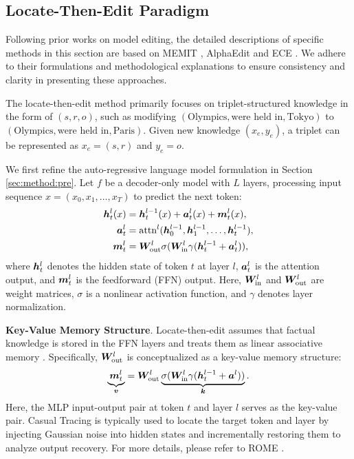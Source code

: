 \subsection{Locate-Then-Edit Paradigm}\label{app:model_edit}
Following prior works on model editing, the detailed descriptions of specific methods in this section are based on MEMIT \cite{MEMIT}, AlphaEdit \cite{AlphaEdit} and ECE \cite{ECE}. We adhere to their formulations and methodological explanations to ensure consistency and clarity in presenting these approaches.

The locate-then-edit method primarily focuses on triplet-structured knowledge in the form of $(s, r, o)$, such as modifying $(\text{Olympics}, \text{were held in}, \text{Tokyo})$ to $(\text{Olympics}, \text{were held in}, \text{Paris})$. Given new knowledge $(x_e, y_e)$, a triplet can be represented as $x_e = (s, r)$ and $y_e = o$.

We first refine the auto-regressive language model formulation in Section \ref{sec:method:pre}. Let $f$ be a decoder-only model with $L$ layers, processing input sequence $x = (x_0, x_1, \dots, x_T)$ to predict the next token:
\begin{equation}
    \begin{aligned}
        {\bm{h}}_t^l(x) &= {\bm{h}}_t^{l - 1}(x) + {\bm{a}}_t^l(x) + {\bm{m}}_t^l(x), \\
        {\bm{a}}_t^l &= \text{attn}^l({\bm{h}}_0^{l - 1}, {\bm{h}}_1^{l - 1}, \dots, {\bm{h}}_t^{l - 1}), \\
        {\bm{m}}_t^l &= {\bm{W}}_{\text{out}}^l \sigma({\bm{W}}_{\text{in}}^l \gamma({\bm{h}}_t^{l - 1}+{\bm{a}}_t^l)),
    \end{aligned}
\end{equation}
where ${\bm{h}}_t^l$ denotes the hidden state of token $t$ at layer $l$, ${\bm{a}}_t^l$ is the attention output, and ${\bm{m}}_t^l$ is the feedforward (FFN) output. Here, ${\bm{W}}_{\text{in}}^l$ and ${\bm{W}}_{\text{out}}^l$ are weight matrices, $\sigma$ is a nonlinear activation function, and $\gamma$ denotes layer normalization.

\textbf{Key-Value Memory Structure}. Locate-then-edit assumes that factual knowledge is stored in the FFN layers and treats them as linear associative memory \cite{key_value}. Specifically, ${\bm{W}}_{\text{out}}^l$ is conceptualized as a key-value memory structure:
\begin{equation}
    \begin{aligned}
        \underbrace{{\bm{m}}_t^l}_{{\bm{v}}} = {\bm{W}}_{\text{out}}^l \underbrace{\sigma({\bm{W}}_{\text{in}}^l \gamma({\bm{h}}_t^{l-1}+{\bm{a}}^l))}_{{\bm{k}}}. \label{eqapp:define_kv}
    \end{aligned}
\end{equation}
Here, the MLP input-output pair at token $t$ and layer $l$ serves as the key-value pair. Casual Tracing is typically used to locate the target token and layer by injecting Gaussian noise into hidden states and incrementally restoring them to analyze output recovery. For more details, please refer to ROME \cite{ROME}.

